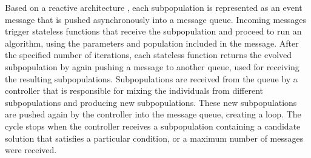 \documentclass[review]{elsarticle}
\begin{document}
Based on a reactive architecture \cite{guervos2018introducing} , each
subpopulation is represented as an event message that is pushed asynchronously
into a message queue. Incoming messages trigger stateless functions that receive
the subpopulation and proceed to run an algorithm, using the parameters and
population included in the message. After the specified number of iterations,
each stateless function returns the evolved subpopulation by again pushing a
message to another queue, used for receiving the resulting subpopulations.
Subpopulations are received from the queue by a controller that is responsible
for mixing the individuals from different subpopulations and producing new
subpopulations. These new subpopulations are pushed again by the controller into
the message queue, creating a loop. The cycle stops when the controller receives
a subpopulation containing a candidate solution that satisfies a particular
condition, or a maximum number of messages were received.
\end{document}
